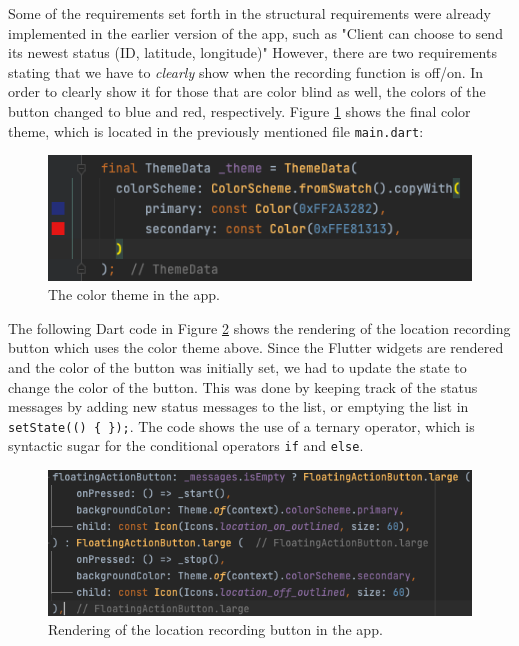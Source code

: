 \documentclass{article}
\begin{document}
Some of the requirements set forth in the structural requirements were already implemented in the earlier version of the app, such as "Client can choose to send its newest status (ID, latitude, longitude)" However, there are two requirements stating that we have to \emph{clearly} show when the recording function is off/on. In order to clearly show it for those that are color blind as well, the colors of the button changed to blue and red, respectively. Figure \ref{fig:color_theme} shows the final color theme, which is located in the previously mentioned file \verb|main.dart|: 

\begin{figure}[H]
    \centering
    \includegraphics[scale=0.70]{graphics/color_theme.png}
    \caption{The color theme in the app.}
    \label{fig:color_theme}
\end{figure}

The following Dart code in Figure \ref{fig:location_toggle} shows the rendering of the location recording button which uses the color theme above. Since the Flutter widgets are rendered and the color of the button was initially set, we had to update the state to change the color of the button. This was done by keeping track of the status messages by adding new status messages to the list, or emptying the list in \verb|setState(() { });|. The code shows the use of a ternary operator, which is syntactic sugar for the conditional operators \verb|if| and \verb|else|.
\begin{figure}[H]
    \centering
    \includegraphics[scale=0.60]{graphics/location_toggle.png}
    \caption{Rendering of the location recording button in the app.}
    \label{fig:location_toggle}
\end{figure}
\end{document}
